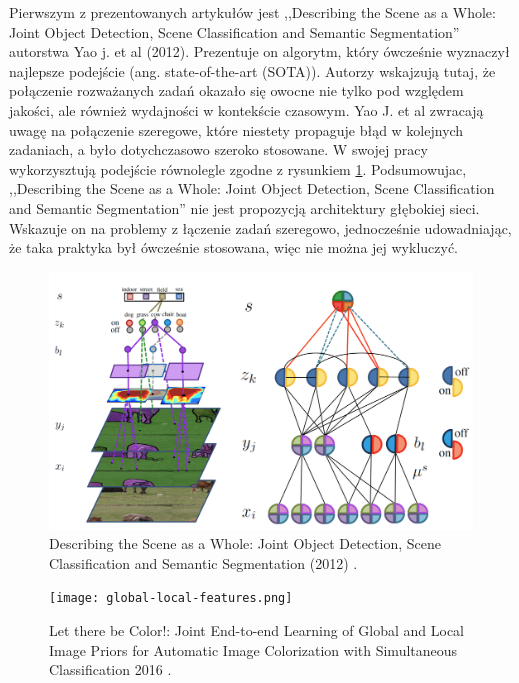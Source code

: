 Pierwszym z prezentowanych artykułów jest ,,Describing the Scene as a Whole: Joint Object Detection, Scene Classification and Semantic Segmentation'' autorstwa Yao j. et al (2012)\cite{yao2012describing}. Prezentuje on algorytm, który ówcześnie wyznaczył najlepsze podejście (ang. state-of-the-art (SOTA)). Autorzy wskajzują tutaj, że połączenie rozważanych zadań okazało się owocne nie tylko pod względem jakości, ale również wydajności w kontekście czasowym. Yao J. et al zwracają uwagę na połączenie szeregowe, które niestety propaguje błąd w kolejnych zadaniach, a było dotychczasowo szeroko stosowane. W swojej pracy wykorzysztują podejście równolegle zgodne z rysunkiem \ref{fig:scene-as-a-whole}. Podsumowujac, ,,Describing the Scene as a Whole: Joint Object Detection, Scene Classification and Semantic Segmentation'' nie jest propozycją architektury głębokiej sieci. Wskazuje on na problemy z łączenie zadań szeregowo, jednocześnie udowadniając, że taka praktyka był ówcześnie stosowana, więc nie można jej wykluczyć.

    \begin{figure}[ht!]
        \includegraphics[width=\textwidth]{img/joint-segmentation-and-classification.png}
        \caption{Describing the Scene as a Whole: Joint Object Detection, Scene Classification and Semantic Segmentation (2012) \cite{yao2012describing}.}
        \label{fig:scene-as-a-whole}
    \end{figure}

\begin{figure}[ht!]
    \texttt{[image: global-local-features.png]}
    \caption{Let there be Color!: Joint End-to-end Learning of Global and Local Image Priors for Automatic Image Colorization with Simultaneous Classification 2016 \cite{iizuka2016let}.}
    \label{fig:parrarel-arch}
\end{figure}

